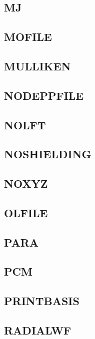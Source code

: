 \documentclass[11pt]{article}
\begin{document}
\clearpage
\subsection{MJ}

\clearpage
\subsection{MOFILE}

\clearpage
\subsection{MULLIKEN}

\clearpage
\subsection{NODEPPFILE}

\clearpage
\subsection{NOLFT}

\clearpage
\subsection{NOSHIELDING}

\clearpage
\subsection{NOXYZ}

\clearpage
\subsection{OLFILE}

\clearpage
\subsection{PARA}

\clearpage
\subsection{PCM}

\clearpage
\subsection{PRINTBASIS}

\clearpage
\subsection{RADIALWF}
\end{document}
